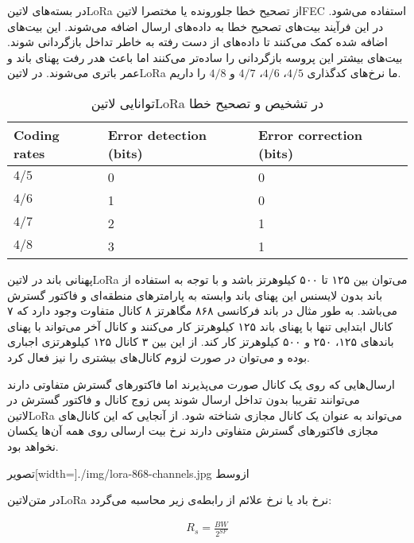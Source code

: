 در بسته‌های ‌لاتین{LoRa} از تصحیح خطا جلورونده یا مختصرا ‌لاتین{FEC} استفاده می‌شود.
در این فرآیند بیت‌های تصحیح خطا به داده‌های ارسال اضافه می‌شوند.
این بیت‌های اضافه شده کمک می‌کنند تا داده‌های از دست رفته به خاطر تداخل بازگردانی شوند.
بیت‌های بیشتر این پروسه بازگردانی را ساده‌تر می‌کنند اما باعث هدر رفت پهنای باند و عمر باتری می‌شوند.
در ‌لاتین{LoRa} ما نرخ‌های کدگذاری $4/5$، $4/6$، $4/7$ و $4/8$ را داریم.

\begin{table}
\caption{توانایی ‌لاتین{LoRa} در تشخیص و تصحیح خطا }
\begin{latin}\begin{tabularx}
  {\textwidth}
  {|*{3}{X|}}
  \toprule
  Coding rates &
  Error detection (bits) &
  Error correction (bits) \\
  \midrule
  $4/5$ &
  0 &
  0 \\
  \midrule
  $4/6$ &
  1 &
  0 \\
  \midrule
  $4/7$ &
  2 &
  1 \\
  \midrule
  $4/8$ &
  3 &
  1 \\
  \bottomrule
\end{tabularx}\end{latin}
\end{table}

پهنانی باند در ‌لاتین{LoRa} می‌توان بین ۱۲۵ تا ۵۰۰ کیلوهرتز باشد و با توجه به استفاده از باند بدون لایسنس این پهنای باند وابسته به پارامتر‌های منطقه‌ای و فاکتور گسترش می‌باشد.
به طور مثال در باند فرکانسی ۸۶۸ مگاهرتز ۸ کانال متفاوت وجود دارد که ۷ کانال ابتدایی تنها با پهنای باند ۱۲۵ کیلوهرتز کار می‌کنند و کانال آخر می‌تواند با پهنای باند‌های
۱۲۵، ۲۵۰ و ۵۰۰ کیلوهرتز کار کند. از این بین ۳ کانال ۱۲۵ کیلوهرتزی اجباری بوده و می‌توان در صورت لزوم کانال‌های بیشتری را نیز فعال کرد.

ارسال‌هایی که روی یک کانال صورت می‌پذیرند اما فاکتورهای گسترش متفاوتی دارند می‌توانند تقریبا بدون تداخل ارسال شوند پس زوج کانال و فاکتور گسترش در ‌لاتین{LoRa} می‌تواند به عنوان
یک کانال مجازی شناخته شود. از آنجایی که این کانال‌های مجازی فاکتورهای گسترش متفاوتی دارند نرخ بیت ارسالی روی همه آن‌ها یکسان نخواهد بود.

‌تصویر[width=\textwidth]{./img/lora-868-channels.jpg}
‌ازوسط

در متن‌لاتین{LoRa} نرخ باد یا نرخ علائم از رابطه‌ی زیر محاسبه می‌گردد:

\begin{align}
  \label{معادله: نرخ باد یا علائم در LoRa}
  R_{s} = \frac{BW}{2^{SF}}
\end{align}

